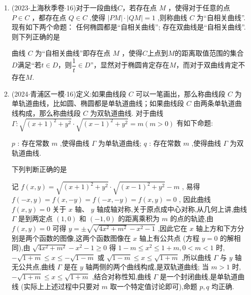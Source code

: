 \begin{enumerate}
    \item (2023$\cdot$上海秋季卷$\cdot$16)对于一段曲线$C$，若存在点 $M$ ，使得对于任意的点 $P \in  C$ ，都存在点 $Q \in  C$ ,使得 $\left| {PM}\right|  \cdot  \left| {QM}\right|  = 1$ ,则称曲线 $C$ 为“自相关曲线”. 现有如下两个命题：  任何椭圆都是“自相关曲线”;    存在双曲线是“自相关曲线”. 则下列正确的是 
    \begin{jieda}
        曲线 $C$ 为“自相关曲线”即存在点 $M$ ，使得$C$上点到$M$的距离取值范围的集合$D$满足“若$t \in D$，则$\dfrac{1}{t} \in D$”，显然对于椭圆肯定存在$M$，而对于双曲线肯定不存在$M$.
    \end{jieda}


    \item (2024$\cdot$青浦区一模$\cdot$16)定义:如果曲线段 $C$ 可以一笔画出，那么称曲线段 $C$ 为单轨道曲线，比如圆、椭圆都是单轨道曲线；如果曲线段 $C$ 由两条单轨道曲线构成，那么称曲线段 $C$ 为双轨道曲线. 对于曲线 $\Gamma  : \sqrt{{\left( x + 1\right) }^{2} + {y}^{2}} \cdot  \sqrt{{\left( x - 1\right) }^{2} + {y}^{2}} = m\left( {m > 0}\right)$ 有如下命题:

    $p$ : 存在常数 $m$ ,使得曲线 $\Gamma$ 为单轨道曲线; $q$ : 存在常数 $m$ ,使得曲线 $\Gamma$ 为双轨道曲线.

    下列判断正确的是 
    \begin{jieda}
        记 $f\left( {x,y}\right)  = \sqrt{{\left( x + 1\right) }^{2} + {y}^{2}} \cdot  \sqrt{{\left( x - 1\right) }^{2} + {y}^{2}} - m$ , 易得 $f\left( {-x,y}\right)  = f\left( {x, - y}\right)  = f\left( {-x, - y}\right)  = f\left( {x,y}\right)  = 0$ , 因此曲线 $f\left( {x,y}\right)  = 0$ 关于 $x$ 轴、 $y$ 轴成轴对称,关于原点成中心对称,从几何上讲,曲线 $\Gamma$ 是到两定点 $\left( {1,0}\right)$ 和 $\left( {-1,0}\right)$ 的距离乘积为 $m$ 的点的轨迹,由 $f\left( {x,y}\right)  = 0$ 可得 $y =  \pm  \sqrt{\sqrt{4{x}^{2} + {m}^{2}} - {x}^{2} - 1}$ ,因此它在 $x$ 轴上方和下方分别是两个函数的图像,这两个函数图像在 $x$ 轴上有公共点 (方程 $y = 0$ 的解相同),由 $\sqrt{4{x}^{2} + {m}^{2}} - {x}^{2} - 1 \geq  0$ 得 $1 - m \leq  {x}^{2} \leq  1 + m,0 < m < 1$ 时, $- \sqrt{1 + m} \leq  x \leq   - \sqrt{1 - m}$ 或 $\sqrt{1 - m} \leq  x \leq  \sqrt{1 + m}$ ,所以曲线 $\Gamma$ 与 $y$ 轴无公共点,曲线 $\Gamma$ 是在 $y$ 轴两侧的两个曲线构成,是双轨道曲线; 当 $m > 1$ 时, $- \sqrt{1 + m} \leq  x \leq  \sqrt{1 + m}$ ,结合对称性知,曲线 $\Gamma$ 是一个封闭曲线,是单轨道曲线 (实际上上述过程中只要对 $m$ 取一个特定值讨论即可),命题 $p,q$ 均正确.
        

\end{jieda}
\end{enumerate}
